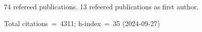 74 refereed publications. 13 refeered publications as first author.

Total citations~=~4311; h-index~=~35 (2024-09-27)